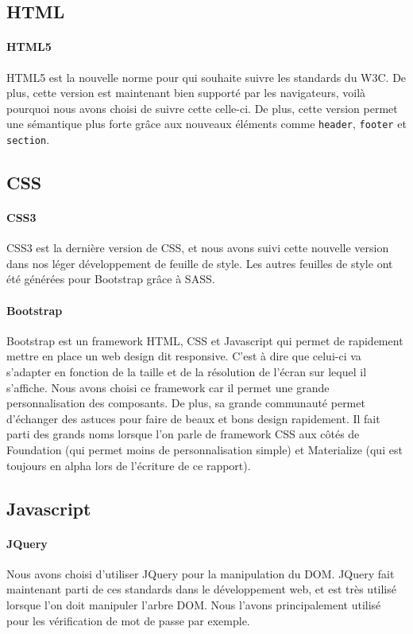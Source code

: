 \documentclass[12pt]{article}
\begin{document}
    \subsection{HTML}
        \paragraph{HTML5} HTML5 est la nouvelle norme pour qui souhaite suivre les standards du W3C. De plus, cette version est maintenant bien supporté par les navigateurs, voilà pourquoi nous avons choisi de suivre cette celle-ci. De plus, cette version permet une sémantique plus forte grâce aux nouveaux éléments comme \texttt{header}, \texttt{footer} et \texttt{section}.
        
    \subsection{CSS}
        \paragraph{CSS3} CSS3 est la dernière version de CSS, et nous avons suivi cette nouvelle version dans nos léger développement de feuille de style. Les autres feuilles de style ont été générées pour Bootstrap grâce à SASS.
        
        \paragraph{Bootstrap} Bootstrap est un framework HTML, CSS et Javascript qui permet de rapidement mettre en place un web design dit responsive. C'est à dire que celui-ci va s'adapter en fonction de la taille et de la résolution de l'écran sur lequel il s'affiche. Nous avons choisi ce framework car il permet une grande personnalisation des composants. De plus, sa grande communauté permet d'échanger des astuces pour faire de beaux et bons design rapidement. Il fait parti des grands noms lorsque l'on parle de framework CSS aux côtés de Foundation (qui permet moins de personnalisation simple) et Materialize (qui est toujours en alpha lors de l'écriture de ce rapport).
        
    \subsection{Javascript}
        \paragraph{JQuery} Nous avons choisi d'utiliser JQuery pour la manipulation du DOM. JQuery fait maintenant parti de ces standards dans le développement web, et est très utilisé lorsque l'on doit manipuler l'arbre DOM. Nous l'avons principalement utilisé pour les vérification de mot de passe par exemple.
    
\end{document}
